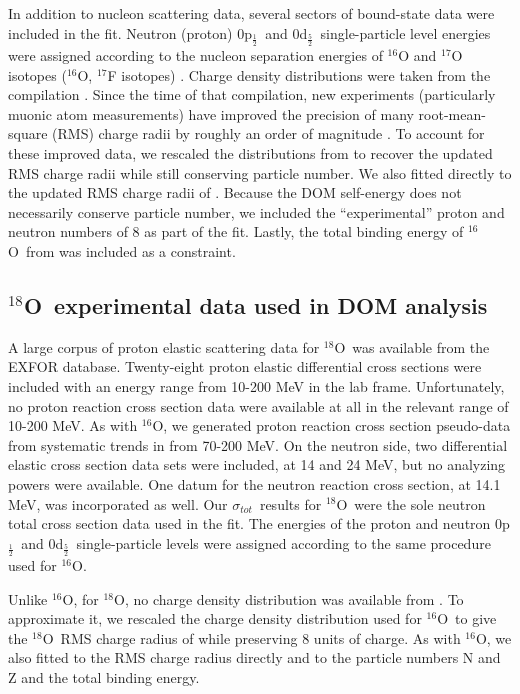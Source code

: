 \documentclass[twocolumn,secnumarabic,amssymb, nobibnotes, aps, prl,
superscriptaddress, nobalancelastpage]{revtex4}
\newcommand{\tot}{\ensuremath{\sigma_{tot}}}
\newcommand{\oSix}{\ensuremath{^{16}}O}
\newcommand{\oEight}{\ensuremath{^{18}}O}
\newcommand{\pOne}{p\ensuremath{_{\frac{1}{2}}}}
\newcommand{\dFive}{d\ensuremath{_{\frac{5}{2}}}}
\begin{document}
In addition to nucleon scattering data, several sectors of bound-state data were
included in the fit. Neutron (proton) 0\pOne\ and 0\dFive\
single-particle level energies were
assigned according to the nucleon separation energies of $^{16}$O and
$^{17}$O isotopes ($^{16}$O, $^{17}$F isotopes) \cite{AME2016}.
Charge density distributions were taken from the compilation \cite{DeVries1987}.
Since the time of that compilation,
new experiments (particularly muonic atom measurements) have improved the precision
of many root-mean-square (RMS) charge radii by roughly an order of magnitude \cite{Angeli2013}.
To account for these improved data, we rescaled the distributions from
\cite{DeVries1987} to recover the updated
RMS charge radii while still conserving particle number. We also fitted directly
to the updated RMS charge radii of \cite{Angeli2013}.
Because the DOM self-energy does not necessarily conserve particle number, we
included the ``experimental'' proton and neutron numbers of 8 as part of the
fit. Lastly, the total binding energy of \oSix\ from \cite{AME2016} was
included as a constraint. 

\subsection{\oEight\ experimental data used in DOM analysis}
A large corpus of proton elastic scattering data for \oEight\ was
available from the EXFOR database. Twenty-eight proton elastic differential cross
sections were included with an energy range from 10-200 MeV in the lab frame.
Unfortunately, no proton reaction cross section data were available at all in
the relevant range of 10-200 MeV. As with \oSix, we generated proton reaction cross section pseudo-data from
systematic trends in \cite{Carlson1975} from 70-200 MeV. On the neutron side, two
differential elastic cross section data sets were included, at 14 and 24 MeV,
but no analyzing powers were available. One datum for the neutron reaction cross
section, at 14.1 MeV, was incorporated as well.
Our \tot\ results for \oEight\ were the
sole neutron total cross section data used in the fit. The energies of the
proton and neutron 0\pOne\ and 0\dFive\ single-particle
levels were assigned according to the same procedure used for \oSix.

Unlike \oSix, for \oEight, no charge density distribution was available from
\cite{DeVries1987}. To approximate it, we rescaled the charge density
distribution used for \oSix\ to give the \oEight\ RMS charge radius of
\cite{Angeli2013} while preserving 8 units of charge.
As with \oSix, we also fitted to the
RMS charge radius directly and to the particle numbers N and Z and the
total binding energy.
\end{document}
